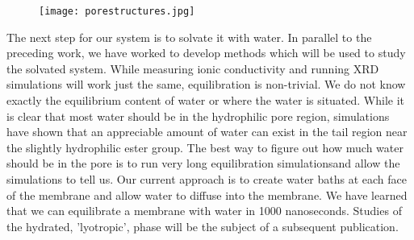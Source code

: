 \begin{figure}
\caption{}
\label{figure:metastable}
\texttt{[image: porestructures.jpg]}
\centering
\end{figure}

The next step for our system is to solvate it with water. In parallel 
to the preceding work, we have worked to develop methods which will be
used to study the solvated system. While measuring ionic conductivity 
and running XRD simulations will work just the same, equilibration is 
non-trivial. We do not know exactly the equilibrium content of water 
or where the water is situated. While it is clear that most water should be in the hydrophilic pore region, simulations have shown that an 
appreciable amount of water can exist in the tail region near the 
slightly hydrophilic ester group. The best way to figure out how much 
water should be in the pore is to run very long equilibration simulationsand allow the simulations to tell us. Our current approach is to create
water baths at each face of the membrane and allow water to diffuse into
the membrane. We have learned that we can equilibrate a membrane with
water in 1000 nanoseconds. Studies of the hydrated, 'lyotropic', phase
will be the subject of a subsequent publication.
